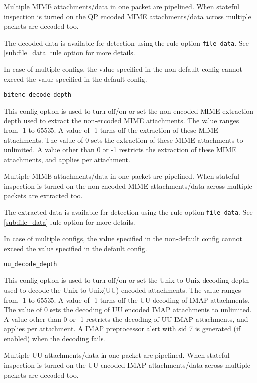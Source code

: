 \documentclass[english]{report}
\newcounter{slistnum}
\newenvironment{slist}
{ \begin{list}{ {\bf \arabic{slistnum}.} }{\usecounter{slistnum} } }
{ \end{list} }
\begin{document}
\begin{slist}
Multiple MIME attachments/data in one packet are pipelined. When stateful inspection
is turned on the QP encoded MIME attachments/data across multiple packets are decoded too.

The decoded data is available for detection using the rule option \texttt{file\_data}.
See \ref{sub:file_data} rule option for more details.

In case of multiple configs, the value specified in the non-default config cannot exceed
the value specified in the default config.

\item \texttt{bitenc\_decode\_depth}

This config option is used to turn off/on or set the non-encoded MIME extraction
depth used to extract the non-encoded MIME attachments. The
value ranges from -1 to 65535. A value of -1 turns off the extraction of these MIME
attachments. The value of 0 sets the extraction of these MIME attachments to unlimited.
A value other than 0 or -1 restricts the extraction of these MIME attachments, and applies 
per attachment.

Multiple MIME attachments/data in one packet are pipelined. When stateful inspection
is turned on the non-encoded MIME attachments/data across multiple packets are extracted too.

The extracted data is available for detection using the rule option \texttt{file\_data}.
See \ref{sub:file_data} rule option for more details.

In case of multiple configs, the value specified in the non-default config cannot exceed
the value specified in the default config.

\item \texttt{uu\_decode\_depth}

This config option is used to turn off/on or set the Unix-to-Unix decoding depth
used to decode the Unix-to-Unix(UU) encoded attachments. The value ranges
from -1 to 65535. A value of -1 turns off the UU decoding of IMAP attachments.
The value of 0 sets the decoding of UU encoded IMAP attachments to unlimited. A
value other than 0 or -1 restricts the decoding of UU IMAP attachments, and applies per 
attachment. A IMAP preprocessor alert with sid 7 is generated (if enabled) when the decoding fails.

Multiple UU attachments/data in one packet are pipelined. When stateful inspection
is turned on the UU encoded IMAP attachments/data across multiple packets are decoded too.


\end{slist}
\end{document}
